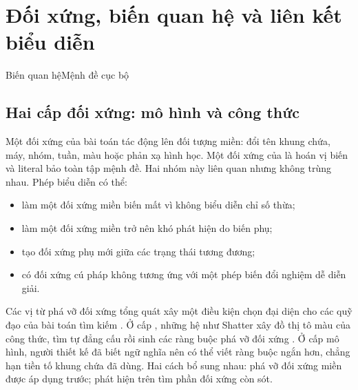 \chapter{Đối xứng, biến quan hệ và liên kết biểu diễn}


  {Biến quan hệ}{Mệnh đề cục bộ}

\section{Hai cấp đối xứng: mô hình và công thức}

Một đối xứng của bài toán tác động lên đối tượng miền: đổi tên khung chứa, máy,
nhóm, tuần, màu hoặc phản xạ hình học. Một đối xứng của \CNF là hoán vị biến
và literal bảo toàn tập mệnh đề. Hai nhóm này liên quan nhưng không trùng nhau.
Phép biểu diễn có thể:
\begin{itemize}
  \item làm một đối xứng miền biến mất vì không biểu diễn chỉ số thừa;
  \item làm một đối xứng miền trở nên khó phát hiện do biến phụ;
  \item tạo đối xứng phụ mới giữa các trạng thái tương đương;
  \item có đối xứng cú pháp không tương ứng với một phép biến đổi nghiệm dễ
        diễn giải.
\end{itemize}

Các vị từ phá vỡ đối xứng tổng quát xây một điều kiện chọn đại diện cho các quỹ
đạo của bài toán tìm kiếm \parencite{crawford1996symmetry}. Ở cấp \CNF, những
hệ như Shatter xây đồ thị tô màu của công thức, tìm tự đẳng cấu rồi sinh các
ràng buộc phá vỡ đối xứng \parencite{aloul2003shatter}. Ở cấp mô hình, người thiết
kế đã biết ngữ nghĩa nên có thể viết ràng buộc ngắn hơn, chẳng hạn tiền tố
khung chứa đã dùng. Hai cách bổ sung nhau: phá vỡ đối xứng miền được áp dụng trước;
phát hiện trên \CNF tìm phần đối xứng còn sót.

